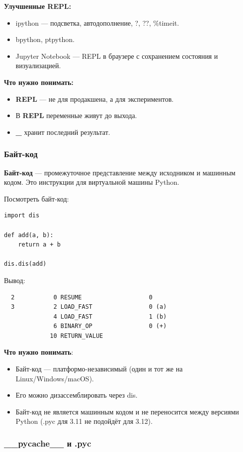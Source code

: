 \textbf{Улучшенные REPL:}
\begin{itemize}
\item ipython — подсветка, автодополнение, ?, ??, \%timeit.
\item bpython, ptpython.
\item Jupyter Notebook — REPL в браузере с сохранением состояния и визуализацией.
\end{itemize}

\textbf{Что нужно понимать:}
\begin{itemize}
\item \textbf{REPL} — не для продакшена, а для экспериментов.
\item В \textbf{REPL} переменные живут до выхода.
\item  \textbf{\_} хранит последний результат.
\end{itemize}

\subsubsection{Байт-код}

\textbf{Байт-код} — промежуточное представление между исходником и машинным кодом. Это инструкции для виртуальной машины Python.

Посмотреть байт-код:
\begin{lstlisting}
import dis

def add(a, b):
    return a + b

dis.dis(add)
\end{lstlisting}

Вывод:
\begin{lstlisting}
  2           0 RESUME                   0
  3           2 LOAD_FAST                0 (a)
              4 LOAD_FAST                1 (b)
              6 BINARY_OP                0 (+)
             10 RETURN_VALUE
\end{lstlisting}

\textbf{Что нужно понимать}:
\begin{itemize}
\item Байт-код — платформо-независимый (один и тот же на Linux/Windows/macOS).
\item Его можно дизассемблировать через dis.
\item Байт-код не является машинным кодом и не переносится между версиями Python (.pyc для 3.11 не подойдёт для 3.12).
\end{itemize}

\subsubsection{\_\_pycache\_\_ и .pyc}

